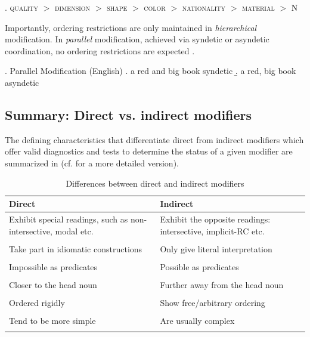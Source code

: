 \ex. \hspace*{-2mm}\textsc{quality} $>$ \textsc{dimension} $>$ \textsc{shape} $>$ \textsc{color} $>$ \textsc{nationality} $>$ \textsc{material} $>$ N \label{hierarchyjo}

Importantly, ordering restrictions are only maintained in \textit{hierarchical} modification. In \textit{parallel} modification, achieved via syndetic or asyndetic coordination, no ordering restrictions are expected \citep[578–580]{sproat:1991:the}. 

\ex. Parallel Modification (English)
\a. a red and big book \null \hfill syndetic
\b. a red, big book \null \hfill asyndetic

\subsection{Summary: Direct vs. indirect modifiers}
\largerpage[2.5]
The defining characteristics that differentiate direct from indirect modifiers which offer valid diagnostics and tests to determine the status of a given modifier are summarized in  (cf. \citealt[33]{cinque:2010:adj} for a more detailed version).

\begin{table}
\begin{tabularx}{\textwidth}{QQ}
\lsptoprule
\textbf{Direct} & \textbf{Indirect} \\
\midrule
 Exhibit special readings, such as non-intersective, modal etc. & Exhibit the opposite readings: intersective, implicit-RC etc. \\
\\[-.7em]
Take part in idiomatic constructions & Only give literal interpretation \\
\\[-.7em]
Impossible as predicates & Possible as predicates \\
\\[-.7em]
Closer to the head noun & Further away from the head noun \\
\\[-.7em]
Ordered rigidly & Show free/arbitrary ordering\\
\\[-.7em]
Tend to be more simple & Are usually complex\\
\lspbottomrule
\end{tabularx}
\caption{Differences between direct and indirect modifiers}
\label{table differences direct and indirect}
\end{table}

